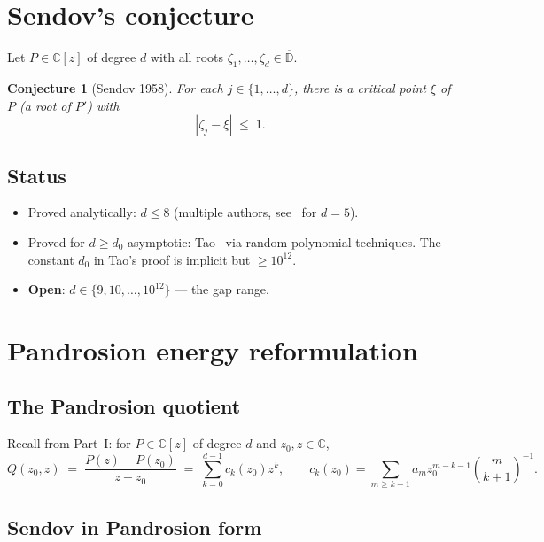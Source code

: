 \documentclass[11pt,a4paper]{article}
\newtheorem{conjecture}[theorem]{Conjecture}
\begin{document}
\tableofcontents

\section{Sendov's conjecture}\label{sec:setup}

Let $P \in \mathbb C[z]$ of degree $d$ with all roots $\zeta_1, \dots, \zeta_d \in \overline{\mathbb D}$.

\begin{conjecture}[Sendov 1958]\label{conj:sendov}
For each $j \in \{1, \dots, d\}$, there is a critical point $\xi$ of $P$ (a root of $P'$) with
\begin{equation}\label{eq:sendov}
|\zeta_j - \xi| \;\le\; 1.
\end{equation}
\end{conjecture}

\subsection{Status}
\begin{itemize}
\item Proved analytically: $d \le 8$ (multiple authors, see~\cite{borcea} for $d=5$).
\item Proved for $d \ge d_0$ asymptotic: Tao~\cite{tao} via random polynomial techniques. The constant $d_0$ in Tao's proof is implicit but $\ge 10^{12}$.
\item \textbf{Open}: $d \in \{9, 10, \dots, 10^{12}\}$ — the gap range.
\end{itemize}

\section{Pandrosion energy reformulation}\label{sec:reform}

\subsection{The Pandrosion quotient}

Recall from Part~I: for $P \in \mathbb C[z]$ of degree $d$ and $z_0, z \in \mathbb C$,
\begin{equation}\label{eq:Q-recall}
Q(z_0, z) \;=\; \frac{P(z) - P(z_0)}{z - z_0} \;=\; \sum_{k=0}^{d-1} c_k(z_0) z^k, \qquad c_k(z_0) = \sum_{m \ge k+1} a_m z_0^{m-k-1} \binom{m}{k+1}^{-1}.
\end{equation}

\subsection{Sendov in Pandrosion form}
\end{document}
